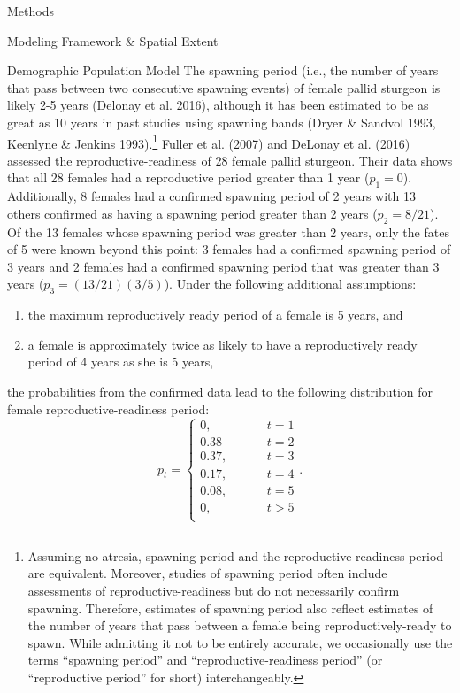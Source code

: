 \documentclass[12pt]{article}
\begin{document}
\begin{section}{Methods}
\begin{subsection}{Modeling Framework \& Spatial Extent}
\begin{subsubsection}{Demographic Population Model}
The spawning period (i.e., the number of years that pass between two consecutive spawning events) of female pallid sturgeon is likely 2-5 years (Delonay et al. 2016), although it has been estimated to be as great as 10 years in past studies using spawning bands (Dryer \& Sandvol 1993, Keenlyne \& Jenkins 1993).\footnote{Assuming no atresia, spawning period and the reproductive-readiness period are equivalent.  Moreover, studies of spawning period often include assessments of reproductive-readiness but do not necessarily confirm spawning.  Therefore, estimates of spawning period also reflect estimates of the number of years that pass between a female being reproductively-ready to spawn.  While admitting it not to be entirely accurate, we occasionally use the terms ``spawning period'' and ``reproductive-readiness period'' (or ``reproductive period'' for short) interchangeably.}  Fuller et al. (2007) and DeLonay et al. (2016) assessed the reproductive-readiness of  28 female pallid sturgeon.  Their data shows that all 28 females had a reproductive period greater than 1 year ($p_1=0$).  Additionally, 8 females had a confirmed spawning period of 2 years with 13 others confirmed as having a spawning period greater than 2 years ($p_2=8/21$).  Of the 13 females whose spawning period was greater than 2 years, only the fates of 5 were known beyond this point: 3 females had a confirmed spawning period of 3 years and 2 females had a confirmed spawning period that was greater than 3 years ($p_3=(13/21)(3/5)$).  Under the following additional assumptions:
\begin{enumerate}
\item the maximum reproductively ready period of a female is 5 years, and
\item a female is approximately twice as likely to have a reproductively ready period of 4 years as she is 5 years,
\end{enumerate}
the probabilities from the confirmed data lead to the following distribution for female reproductive-readiness period:  
\begin{equation}
p_t = \begin{cases}
0, & \hspace{1cm} t=1\\
0.38 & \hspace{1cm} t=2\\
0.37, & \hspace{1cm} t=3\\
0.17, & \hspace{1cm} t=4\\
0.08, & \hspace{1cm} t=5\\
0, & \hspace{1cm} t>5\\
\end{cases}.
\label{pt}
\end{equation}


\end{subsubsection}
\end{subsection}
\end{section}
\end{document}
